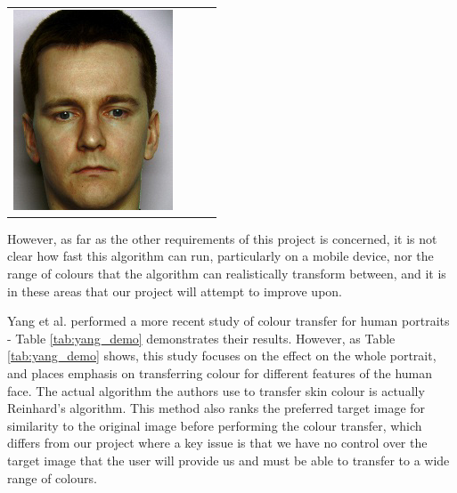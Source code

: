 \begin{longtable}{|N||c|c|c|}
\begin{minipage}{.29\textwidth}
    \includegraphics[width=\textwidth,height=\textheight,keepaspectratio]{images/seo_result1}
  \end{minipage} \\
\end{longtable}

However, as far as the other requirements of this project is concerned, it is not clear how fast this algorithm can run, particularly on a mobile device, nor the range of colours that the algorithm can realistically transform between, and it is in these areas that our project will attempt to improve upon.

Yang et al. performed a more recent study of colour transfer for human portraits \cite{yang_2017_semantic} - Table \ref{tab:yang_demo} demonstrates their results. However, as Table \ref{tab:yang_demo} shows, this study focuses on the effect on the whole portrait, and places emphasis on transferring colour for different features of the human face. The actual algorithm the authors use to transfer skin colour is actually Reinhard's algorithm. This method also ranks the preferred target image for similarity to the original image before performing the colour transfer, which differs from our project where a key issue is that we have no control over the target image that the user will provide us and must be able to transfer to a wide range of colours. 

